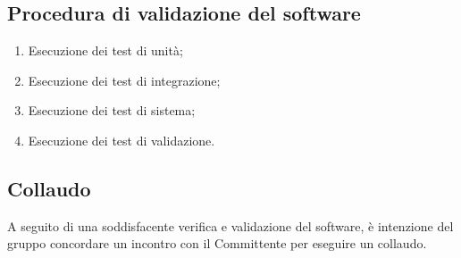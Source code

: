 \documentclass[../NormediProgetto.tex]{subfiles}
\begin{document}
\subsection{Procedura di validazione del software}

\begin{enumerate}
    \item Esecuzione dei test di unità;
    
    \item Esecuzione dei test di integrazione;
    
    \item Esecuzione dei test di sistema;
    
    \item Esecuzione dei test di validazione.
\end{enumerate}

\subsection{Collaudo}

A seguito di una soddisfacente verifica e validazione del software, è intenzione del gruppo concordare un incontro con il Committente per eseguire un collaudo.
\end{document}
